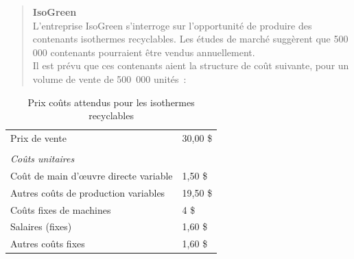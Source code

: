 \documentclass{tufte-handout}
\begin{document}
\begin{enumerate}
\begin{verse}
\textbf{IsoGreen}\\
L'entreprise IsoGreen s’interroge sur l’opportunité de produire des contenants isothermes recyclables. Les études de marché suggèrent que 500 000 contenants pourraient être vendus annuellement.\\
\vspace*{1em}
Il est prévu que ces contenants aient la structure de coût suivante, pour un volume de vente de 500 000 unités :\\
\end{verse}

\begin{table}[htbp]
\caption{Prix coûts attendus pour les isothermes recyclables}
\centering
\begin{tabular}{ll}
Prix de vente & 30,00 \$\\
 & \\
\emph{Coûts unitaires} & \\
Coût de main d’œuvre directe variable & 1,50 \$\\
Autres coûts de production variables & 19,50 \$\\
Coûts fixes de machines & 4 \$\\
Salaires (fixes) & 1,60 \$\\
Autres coûts fixes & 1,60 \$\\
\end{tabular}
\end{table}


\end{enumerate}
\end{document}

